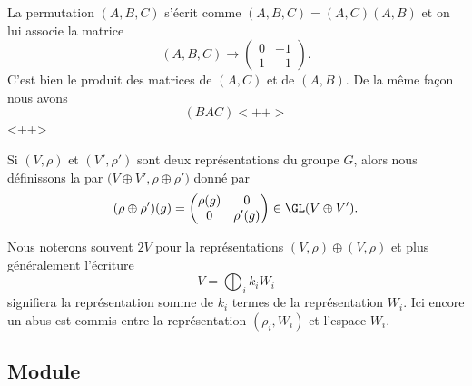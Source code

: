 \begin{example}
\begin{subequations}
	\end{subequations}
	La permutation \( (A,B,C)\) s'écrit comme \( (A,B,C)=(A,C)(A,B)\) et on lui associe la matrice
	\begin{equation}
		(A,B,C)\to\begin{pmatrix}
			0 & -1 \\
			1 & -1
		\end{pmatrix}.
	\end{equation}
	C'est bien le produit des matrices de \( (A,C)\) et de \( (A,B)\). De la même façon nous avons
	\begin{equation}
		(BAC)<++>
	\end{equation}
	<++>
\end{example}

Si \( (V,\rho)\) et \( (V',\rho')\) sont deux représentations du groupe \( G\), alors nous définissons la  par \( \big( V\oplus V',\rho\oplus\rho' \big)\) donné par
\begin{equation}
	(\rho\oplus\rho')(g)=\begin{pmatrix}
		\rho(g) & 0        \\
		0       & \rho'(g)
	\end{pmatrix}\in \GL(V\oplus V').
\end{equation}

Nous noterons souvent \( 2V\) pour la représentations \( (V,\rho)\oplus (V,\rho)\) et plus généralement l'écriture
\begin{equation}
	V=\bigoplus_i k_iW_i
\end{equation}
signifiera la représentation somme de \( k_i\) termes de la représentation \( W_i\). Ici encore un abus est commis entre la représentation \( (\rho_i,W_i)\) et l'espace \( W_i\).

\subsection{Module}


